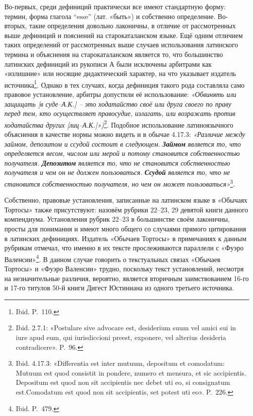 Во-первых, среди дефиниций практически все имеют стандартную форму: термин, форма глагола “esse” (лат. «быть») и собственно определение. Во-вторых, такие определения довольно лаконичны, в отличие от рассмотренных выше дефиниций и пояснений на старокаталанском языке. Ещё одним отличием таких определений от рассмотренных выше случаев использования латинского термина и объяснения на старокаталанском является то, что большинство латинских дефиниций из рукописи А были исключены арбитрами как «излишние» или носящие дидактический характер, на что указывает издатель источника\footnote{Ibid. P.~110.}. Однако в тех случаях, когда дефиниция такого рода составляла само правовое установление, арбитры допустили её использование: \emph{«Обвинять или защищать [в суде--А.К.] -- это ходатайство своё или друга своего по праву перед тем, кто осуществляет правосудие, излагать, или возражать против ходатайства других [лиц--А.К.]»)}\footnote{Ibid. 2.7.1: «Postulare sive advocare est, desiderium suum vel amici sui in iure apud eum, qui iurisdiccioni preest, exponere, vel alterius desideria contradicere». P.~96.}. Подобное использование латиноязычного объяснения в качестве нормы можно видеть и в обычае 4.17.3: \emph{«}\emph{Различие между займом, депозитом и ссудой состоит в следующем. }\textbf{\emph{Займом}}\emph{ является то, что определяется весом, числом или мерой и потому становится собственностью получателя. }\textbf{\emph{Депозитом}}\emph{ является то, что не становится собственностью получателя и чем он не должен }\emph{пользоваться. }\textbf{\emph{Ссудой}}\emph{ является то, что не становится собственностью получателя, но чем он может пользоваться}\emph{»}\footnote{Ibid. 4.17.3: «Differentia est inter mutuum, depositum et comodatum: Mutuum est quod consistit in pondere, numero et mensura, et sic accipientis. Depositum est quod non sit accipientis nec debet uti eo, si consignatum est.Comodatum est quod non sit accipientis, set potest uti eo». P.~226.}.

Собственно, правовые установления, записанные на латинском языке в «Обычаях Тортосы» также присутствуют: назовём рубрики 22--23, 29 девятой книги данного компендиума. Установления рубрик 22--23 в большинстве своём лаконичны, просты для понимания и имеют много общего со случаями прямого цитирования в латинских дефинициях. Издатель «Обычаев Тортосы» в примечаниях к данным рубрикам отмечал, что именно в их тексте прослеживаются параллели с «Фуэро Валенсии»\footnote{Ibid. P.~479.}. В данном случае говорить о текстуальных связах «Обычаев Тортосы» и «Фуэро Валенсии» трудно, поскольку текст установлений, несмотря на незначительные различия, вероятно, является вторичным заимствованием 16-го и 17-го титулов 50-й книги Дигест Юстиниана из одного третьего источника.

